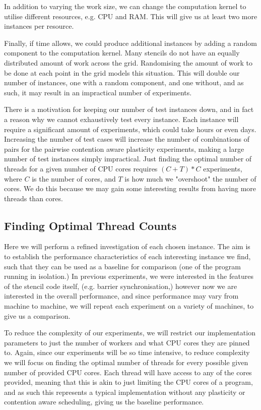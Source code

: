 In addition to varying the work size, we can change the computation kernel to utilise different resources, e.g. CPU and RAM. This will give us at least two more instances per resource. 

Finally, if time allows, we could produce additional instances by adding a random component to the computation kernel. Many stencils do not have an equally distributed amount of work across the grid. Randomising the amount of work to be done at each point in the grid models this situation. This will double our number of instances, one with a random component, and one without, and as such, it may result in an impractical number of experiments.

There is a motivation for keeping our number of test instances down, and in fact a reason why we cannot exhaustively test every instance. Each instance will require a significant amount of experiments, which could take hours or even days. Increasing the number of test cases will increase the number of combinations of pairs for the pairwise contention aware plasticity experiments, making a large number of test instances simply impractical. Just finding the optimal number of threads for a given number of CPU cores requires $(C + T) * C$ experiments, where $C$ is the number of cores, and $T$ is how much we "overshoot" the number of cores. We do this because we may gain some interesting results from having more threads than cores.



\subsection{Finding Optimal Thread Counts}
\label{section:design:optimal_threads}

Here we will perform a refined investigation of each chosen instance. The aim is to establish the performance characteristics of each interesting instance we find, such that they can be used as a baseline for comparison (one of the program running in isolation.) In previous experiments, we were interested in the features of the stencil code itself, (e.g. barrier synchronisation,) however now we are interested in the overall performance, and since performance may vary from machine to machine, we will repeat each experiment on a variety of machines, to give us a comparison.

To reduce the complexity of our experiments, we will restrict our implementation parameters to just the number of workers and what CPU cores they are pinned to. Again, since our experiments will be so time intensive, to reduce complexity we will focus on finding the optimal number of threads for every possible given number of provided CPU cores. Each thread will have access to any of the cores provided, meaning that this is akin to just limiting the CPU cores of a program, and as such this represents a typical implementation without any plasticity or contention aware scheduling, giving us the baseline performance.



